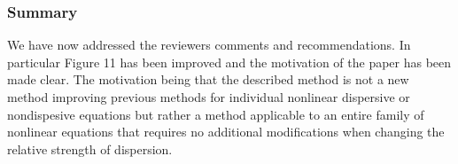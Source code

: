 \documentclass[10pt]{article}
\begin{document}
 
 \subsubsection{Summary}
 
 We have now addressed the reviewers comments and recommendations. In particular Figure 11 has been improved and the motivation of the paper has been made clear. The motivation being that the described method is not a new method improving previous methods for individual nonlinear dispersive or nondispesive equations but rather a method applicable to an entire family of nonlinear equations that requires no additional modifications when changing the relative strength of dispersion. 
\end{document}
